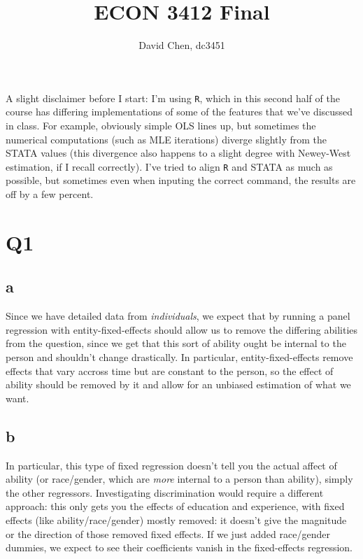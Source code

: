 \documentclass[12pt,letterpaper]{article}
\title{ECON 3412 Final}
\author{David Chen, dc3451}
\theoremstyle{definition}
\begin{document}
\maketitle

A slight disclaimer before I start: I'm using \verb|R|, which in this second half of the course has differing implementations of some of the features that we've discussed in class. For example, obviously simple OLS lines up, but sometimes the numerical computations (such as MLE iterations) diverge slightly from the STATA values (this divergence also happens to a slight degree with Newey-West estimation, if I recall correctly). I've tried to align \verb|R| and STATA as much as possible, but sometimes even when inputing the correct command, the results are off by a few percent.

\section*{Q1}

\subsection*{a}


Since we have detailed data from \textit{individuals}, we expect that by running a panel regression with entity-fixed-effects should allow us to remove the differing abilities from the question, since we get that this sort of ability ought be internal to the person and shouldn't change drastically. In particular, entity-fixed-effects remove effects that vary accross time but are constant to the person, so the effect of ability should be removed by it and allow for an unbiased estimation of what we want.

\subsection*{b}

In particular, this type of fixed regression doesn't tell you the actual affect of ability (or race/gender, which are \textit{more} internal to a person than ability), simply the other regressors. Investigating discrimination would require a different approach: this only gets you the effects of education and experience, with fixed effects (like ability/race/gender) mostly removed: it doesn't give the magnitude or the direction of those removed fixed effects. If we just added race/gender dummies, we expect to see their coefficients vanish in the fixed-effects regression.
\end{document}
